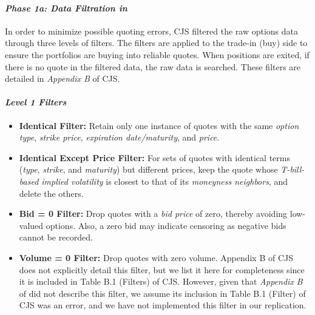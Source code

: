 \documentclass{article}
\begin{document}
\begin{appendices}
\paragraph{\textit{Phase 1a: Data Filtration in \citet{Constantinides2013}}}

In order to minimize possible quoting errors, CJS filtered the raw options data through three levels of filters. The filters are applied to the trade-in (buy) side to ensure the portfolios are buying into reliable quotes. When positions are exited, if there is no quote in the filtered data, the raw data is searched. These filters are detailed in \textit{Appendix B} of CJS.




\paragraph{\textit{Level 1 Filters}}
\begin{itemize}
  \item \textbf{Identical Filter:} Retain only one instance of quotes with the same \textit{option type}, \textit{strike price}, \textit{expiration date/maturity}, and \textit{price}.
  \item \textbf{Identical Except Price Filter:} For sets of quotes with identical terms (\textit{type}, \textit{strike}, and \textit{maturity}) but different prices, keep the quote whose \textit{T-bill-based implied volatility} is closest to that of its \textit{moneyness neighbors}, and delete the others.
  \item \textbf{Bid = 0 Filter:} Drop quotes with a \textit{bid price} of zero, thereby avoiding low-valued options. Also, a zero bid may indicate censoring as negative bids cannot be recorded.
  \item \textbf{Volume = 0 Filter:} Drop quotes with zero volume. Appendix B of CJS does not explicitly detail this filter, but we list it here for completeness since it is included in Table B.1 (Filters) of CJS. However, given that \textit{Appendix B} of \citet{Constantinides2013} did not describe this filter, we assume its inclusion in Table B.1 (Filter) of CJS was an error, and we have not implemented this filter in our replication.
\end{itemize}



\end{appendices}
\end{document}
